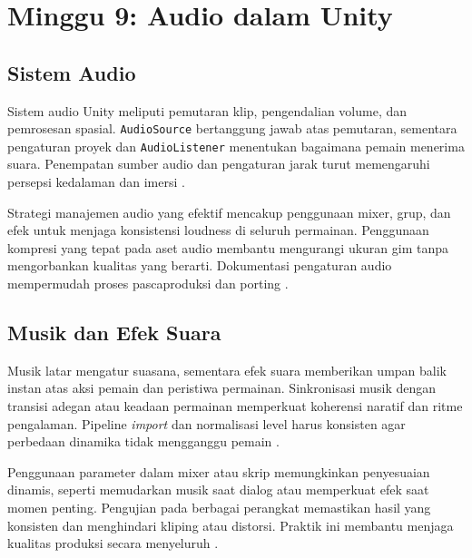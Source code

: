 \documentclass[../main.tex]{subfiles}
\begin{document}
\chapter{Minggu 9: Audio dalam Unity}

\section{Sistem Audio}
Sistem audio Unity meliputi pemutaran klip, pengendalian volume, dan pemrosesan spasial. \texttt{AudioSource} bertanggung jawab atas pemutaran, sementara pengaturan proyek dan \texttt{AudioListener} menentukan bagaimana pemain menerima suara. Penempatan sumber audio dan pengaturan jarak turut memengaruhi persepsi kedalaman dan imersi \parencite{unity-audio,unity-audiosource}.

Strategi manajemen audio yang efektif mencakup penggunaan mixer, grup, dan efek untuk menjaga konsistensi loudness di seluruh permainan. Penggunaan kompresi yang tepat pada aset audio membantu mengurangi ukuran gim tanpa mengorbankan kualitas yang berarti. Dokumentasi pengaturan audio mempermudah proses pascaproduksi dan porting \parencite{unity-audio}.

\section{Musik dan Efek Suara}
Musik latar mengatur suasana, sementara efek suara memberikan umpan balik instan atas aksi pemain dan peristiwa permainan. Sinkronisasi musik dengan transisi adegan atau keadaan permainan memperkuat koherensi naratif dan ritme pengalaman. Pipeline \textit{import} dan normalisasi level harus konsisten agar perbedaan dinamika tidak mengganggu pemain \parencite{unity-audio}.

Penggunaan parameter dalam mixer atau skrip memungkinkan penyesuaian dinamis, seperti memudarkan musik saat dialog atau memperkuat efek saat momen penting. Pengujian pada berbagai perangkat memastikan hasil yang konsisten dan menghindari kliping atau distorsi. Praktik ini membantu menjaga kualitas produksi secara menyeluruh \parencite{unity-audiosource}.

\onlyinsubfile{\printbibliography}
\end{document}
